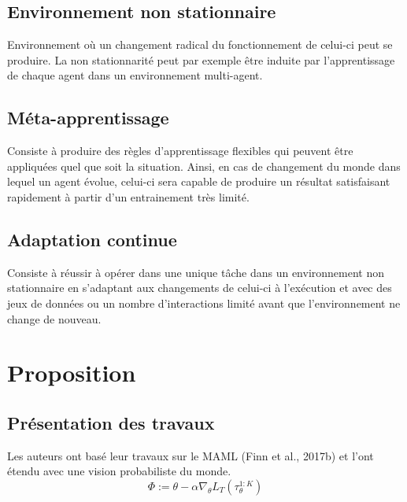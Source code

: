 \documentclass[a4paper,11pt]{article}
\begin{document}
    \subsection{Environnement non stationnaire}
    \vspace{-1em}
    Environnement où un changement radical du fonctionnement de celui-ci peut se produire. 
    La non stationnarité peut par exemple être induite par l’apprentissage de chaque 
    agent dans un environnement multi-agent.

    \subsection{Méta-apprentissage}
    \vspace{-1em}
    Consiste à produire des règles d’apprentissage flexibles qui 
    peuvent être appliquées quel que soit la situation. Ainsi, en cas de changement du monde 
    dans lequel un agent évolue, celui-ci sera capable de produire un résultat satisfaisant 
    rapidement à partir d’un entrainement très limité.

    \subsection{Adaptation continue}
    \vspace{-1em}
    Consiste à réussir à opérer dans une unique tâche dans un environnement non stationnaire 
    en s’adaptant aux changements de celui-ci à l’exécution et avec des jeux de données ou un 
    nombre d’interactions limité avant que l’environnement ne change de nouveau.

    \section{Proposition}

    \subsection{Présentation des travaux}
    \vspace{-1em}

    Les auteurs ont basé leur travaux sur le MAML (Finn et al., 2017b) et l'ont étendu 
    avec une vision probabiliste du monde.
    \begin{equation}
      \Phi := \theta - \alpha\nabla_\theta L_T(\tau_\theta^{1:K})
    \end{equation}
\end{document}
